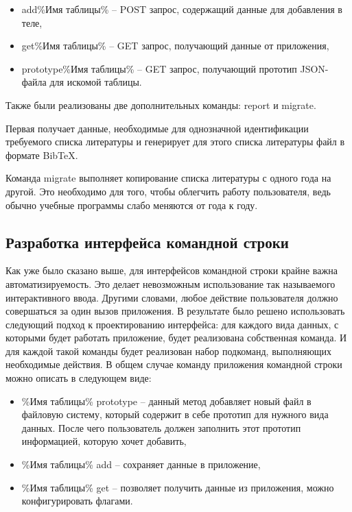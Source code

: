 \begin{itemize}
    \item add\%Имя таблицы\% -- POST запрос, содержащий данные для добавления в теле,
    \item get\%Имя таблицы\% -- GET запрос, получающий данные от приложения,
    \item prototype\%Имя таблицы\% -- GET запрос, получающий прототип JSON-файла для искомой таблицы.
\end{itemize}

Также были реализованы две дополнительных команды: report и migrate.

Первая получает данные, необходимые для однозначной идентификации требуемого списка литературы
и генерирует для этого списка литературы файл в формате BibTeX. 

Команда migrate выполняет копирование списка литературы с одного года на другой. Это необходимо для того,
чтобы облегчить работу пользователя, ведь обычно учебные программы слабо меняются от года к году.

\subsection*{Разработка интерфейса командной строки}

Как уже было сказано выше, для интерфейсов командной строки крайне важна автоматизируемость.
Это делает невозможным использование так называемого интерактивного ввода. Другими словами,
любое действие пользователя должно совершаться за один вызов приложения. В результате
было решено использовать следующий подход к проектированию интерфейса: для каждого вида данных,
с которыми будет работать приложение, будет реализована собственная команда. И для каждой такой
команды будет реализован набор подкоманд, выполняющих необходимые действия. В общем случае
команду приложения командной строки можно описать в следующем виде:

\begin{itemize}
    \item \%Имя таблицы\% prototype -- данный метод добавляет новый файл в файловую систему,
        который содержит в себе прототип для нужного вида данных. После чего пользователь
        должен заполнить этот прототип информацией, которую хочет добавить,
    \item \%Имя таблицы\% add -- сохраняет данные в приложение,
    \item \%Имя таблицы\% get -- позволяет получить данные из приложения, можно конфигурировать
        флагами.
\end{itemize}

